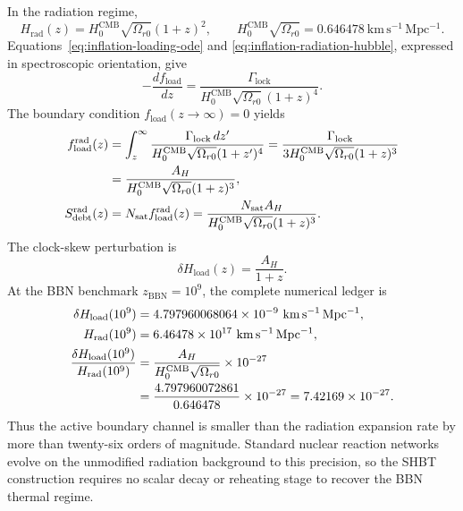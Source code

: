 \documentclass[11pt,letterpaper]{article}
\theoremstyle{plain}
\newcommand{\Nsat}{N_{\text{sat}}}
\newcommand{\hcmb}{H_0^{\text{CMB}}}
\newcommand{\kmsmpc}{\mathrm{km\,s^{-1}\,Mpc^{-1}}}
\newcommand{\fload}{f_{\text{load}}}
\newcommand{\debtentropy}{S_{\text{debt}}}
\newcommand{\GammaLock}{\Gamma_{\text{lock}}}
\newcommand{\AH}{A_H}
\begin{document}
In the radiation regime,
\begin{equation}
\label{eq:inflation-radiation-hubble}
 H_{\mathrm{rad}}(z)
 =
 \hcmb\sqrt{\Omega_{r0}}(1+z)^2,
 \qquad
 \hcmb\sqrt{\Omega_{r0}}
 =0.646478\ \kmsmpc.
\end{equation}
Equations~\eqref{eq:inflation-loading-ode} and
\eqref{eq:inflation-radiation-hubble}, expressed in spectroscopic orientation,
give
\begin{equation}
\label{eq:inflation-radiation-loading-derivative}
 -\frac{d\fload}{dz}
 =
 \frac{\GammaLock}
 {\hcmb\sqrt{\Omega_{r0}}(1+z)^4}.
\end{equation}
The boundary condition $\fload(z\rightarrow\infty)=0$ yields
\begin{align}
\label{eq:inflation-radiation-asymptotic-solution}
 \fload^{\mathrm{rad}}(z)
 &=
 \int_z^\infty
 \frac{\GammaLock\,dz'}
 {\hcmb\sqrt{\Omega_{r0}}(1+z')^4}
 =
 \frac{\GammaLock}
 {3\hcmb\sqrt{\Omega_{r0}}(1+z)^3}
 \notag\\
 &=
 \frac{\AH}
 {\hcmb\sqrt{\Omega_{r0}}(1+z)^3},
 \\
\label{eq:inflation-radiation-entropy-debt}
 \debtentropy^{\mathrm{rad}}(z)
 &=
 \Nsat\fload^{\mathrm{rad}}(z)
 =
 \frac{\Nsat\AH}
 {\hcmb\sqrt{\Omega_{r0}}(1+z)^3}.
\end{align}
The clock-skew perturbation is
\begin{equation}
\label{eq:inflation-clock-skew}
 \delta H_{\mathrm{load}}(z)
 =
 \frac{\AH}{1+z}.
\end{equation}
At the BBN benchmark $z_{\mathrm{BBN}}=10^9$, the complete numerical ledger is
\begin{align}
\label{eq:inflation-bbn-decoupling-proof}
 \delta H_{\mathrm{load}}(10^9)
 &=4.797960068064\times10^{-9}\ \kmsmpc,
 \\
 H_{\mathrm{rad}}(10^9)
 &=6.46478\times10^{17}\ \kmsmpc,
 \\
 \frac{\delta H_{\mathrm{load}}(10^9)}
 {H_{\mathrm{rad}}(10^9)}
 &=
 \frac{\AH}{\hcmb\sqrt{\Omega_{r0}}}\times10^{-27}
 \notag\\
 &=
 \frac{4.797960072861}{0.646478}\times10^{-27}
 =7.42169\times10^{-27}.
\end{align}
Thus the active boundary channel is smaller than the radiation expansion rate
by more than twenty-six orders of magnitude.  Standard nuclear reaction
networks evolve on the unmodified radiation background to this precision, so
the SHBT construction requires no scalar decay or reheating stage to recover
the BBN thermal regime.
\end{document}
